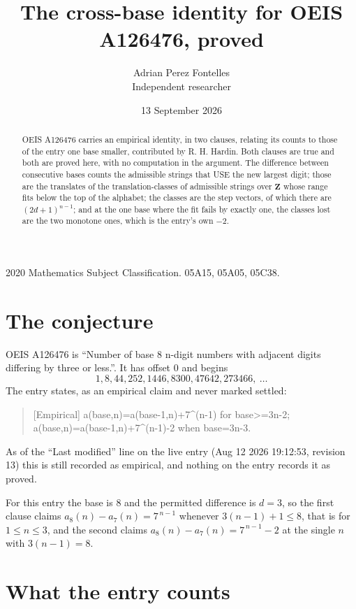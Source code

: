 \documentclass[11pt,a4paper]{article}
\title{The cross-base identity for OEIS A126476, proved}
\author{Adrian Perez Fontelles\\ \small Independent researcher}
\date{13 September 2026}
\theoremstyle{plain}
\theoremstyle{definition}
\begin{document}
\maketitle

\begin{abstract}
OEIS A126476 carries an empirical identity, in two clauses, relating its counts to those of the
entry one base smaller, contributed by R. H. Hardin. Both clauses are true and both are proved
here, with no computation in the argument. The difference between consecutive bases counts the
admissible strings that USE the new largest digit; those are the translates of the
translation-classes of admissible strings over $\mathbf{Z}$ whose range fits below the top of
the alphabet; the classes are the step vectors, of which there are $(2d+1)^{n-1}$; and at the
one base where the fit fails by exactly one, the classes lost are the two monotone ones, which
is the entry's own $-2$.
\end{abstract}

\noindent\small 2020 Mathematics Subject Classification. 05A15, 05A05, 05C38.\normalsize

\section{The conjecture}

OEIS A126476 is ``Number of base 8 n-digit numbers with adjacent digits differing by three or less.''. It has offset $0$ and begins
\[
1, 8, 44, 252, 1446, 8300, 47642, 273466,\ \dots
\]
The entry states, as an empirical claim and never marked settled:
\begin{quote}
[Empirical] a(base,n)=a(base-1,n)+7\textasciicircum{}(n-1) for base>=3n-2; a(base,n)=a(base-1,n)+7\textasciicircum{}(n-1)-2 when base=3n-3.
\end{quote}
As of the ``Last modified'' line on the live entry (Aug 12 2026 19:12:53, revision 13)
this is still recorded as empirical, and nothing on the entry records it as proved.

For this entry the base is $8$ and the permitted difference is $d=3$, so the first clause
claims $a_{8}(n)-a_{7}(n)=7^{\,n-1}$ whenever $3(n-1)+1\le8$, that is for
$1\le n\le3$, and the second claims $a_{8}(n)-a_{7}(n)=7^{\,n-1}-2$ at the single
$n$ with $3(n-1)=8$.

\section{What the entry counts}
\end{document}

